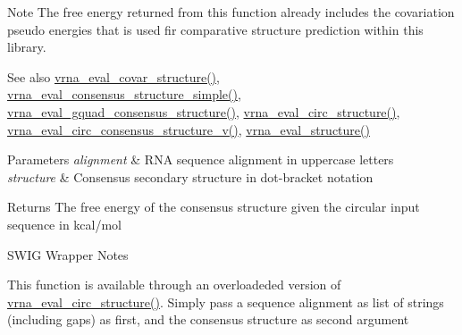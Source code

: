 \begin{DoxyNote}{Note}
The free energy returned from this function already includes the covariation pseudo energies that is used fir comparative structure prediction within this library.
\end{DoxyNote}
\begin{DoxySeeAlso}{See also}
\hyperlink{group__eval_ga6cea75c0eb9857fb59172be54cab09e0}{vrna\+\_\+eval\+\_\+covar\+\_\+structure()}, \hyperlink{group__eval_ga7762c3a7bdcbc3a14ef93259d322c7d6}{vrna\+\_\+eval\+\_\+consensus\+\_\+structure\+\_\+simple()}, \hyperlink{group__eval_gaf09a326b3d57a4b30c27bd0e216198ac}{vrna\+\_\+eval\+\_\+gquad\+\_\+consensus\+\_\+structure()}, \hyperlink{group__eval_ga3e05a23ddf9b083f4e69881e440d4866}{vrna\+\_\+eval\+\_\+circ\+\_\+structure()}, \hyperlink{group__eval_gae89240c230e4740b22a703ee953396b9}{vrna\+\_\+eval\+\_\+circ\+\_\+consensus\+\_\+structure\+\_\+v()}, \hyperlink{group__eval_ga58f199f1438d794a265f3b27fc8ea631}{vrna\+\_\+eval\+\_\+structure()}
\end{DoxySeeAlso}

\begin{DoxyParams}{Parameters}
{\em alignment} & R\+NA sequence alignment in uppercase letters \\
\hline
{\em structure} & Consensus secondary structure in dot-\/bracket notation \\
\hline
\end{DoxyParams}
\begin{DoxyReturn}{Returns}
The free energy of the consensus structure given the circular input sequence in kcal/mol
\end{DoxyReturn}
\begin{DoxyRefDesc}{S\+W\+I\+G Wrapper Notes}
\item[\hyperlink{wrappers__wrappers000046}{S\+W\+I\+G Wrapper Notes}]This function is available through an overloadeded version of \hyperlink{group__eval_ga3e05a23ddf9b083f4e69881e440d4866}{vrna\+\_\+eval\+\_\+circ\+\_\+structure()}. Simply pass a sequence alignment as list of strings (including gaps) as first, and the consensus structure as second argument \end{DoxyRefDesc}
\mbox{\label{group__eval_gaf09a326b3d57a4b30c27bd0e216198ac}} 

